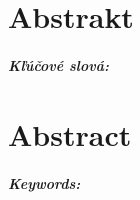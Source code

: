 \documentclass[12pt, oneside]{book}  %
\begin{document}
\vfill\eject


\newpage
\thispagestyle{empty}
\chapter*{Abstrakt}\label{chap:abstract_sk}


\paragraph*{Kľúčové slová:}


\newpage
\thispagestyle{empty}
\chapter*{Abstract}\label{chap:abstract_en}


\paragraph*{Keywords:}




\newpage
\tableofcontents



\newpage
\listoffigures
\listoftables


\mainmatter









\backmatter

\nocite{*}



\end{document}
